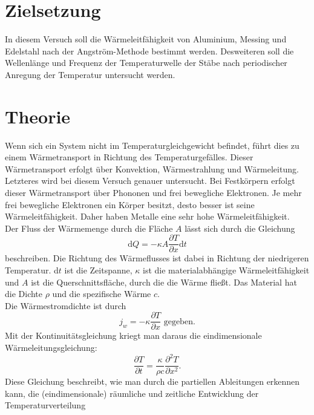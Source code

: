 \section{Zielsetzung}
\label{sec:Zielsetzung}

In diesem Versuch soll die Wärmeleitfähigkeit von Aluminium, Messing und Edelstahl nach der Angström-Methode bestimmt werden. Desweiteren soll die
Wellenlänge und Frequenz der Temperaturwelle der Stäbe nach periodischer Anregung der Temperatur untersucht werden.

\section{Theorie}
\label{sec:Theorie}

Wenn sich ein System nicht im Temperaturgleichgewicht befindet, führt dies zu einem Wärmetransport in Richtung des Temperaturgefälles. Dieser Wärmetransport
erfolgt über Konvektion, Wärmestrahlung und Wärmeleitung. Letzteres wird bei diesem Versuch genauer untersucht. Bei Festkörpern erfolgt dieser Wärmetransport über
Phononen und frei bewegliche Elektronen. Je mehr frei bewegliche Elektronen ein Körper besitzt, desto besser ist seine Wärmeleitfähigkeit. Daher haben Metalle
eine sehr hohe Wärmeleitfähigkeit. \\
Der Fluss der Wärmemenge durch die Fläche $A$ lässt sich durch die Gleichung
\begin{equation}
    \label{eqn:Waermefluss}
    \mathrm{d}Q = - \kappa A \frac{\partial T}{\partial x} \mathrm{d} t
\end{equation}
beschreiben. Die Richtung des Wärmeflusses ist dabei in Richtung der niedrigeren Temperatur. d$t$ ist die Zeitspanne, $\kappa$ ist die materialabhängige
Wärmeleitfähigkeit und $A$ ist die Querschnittsfläche, durch die die Wärme fließt. Das Material hat die Dichte $\rho$ und die spezifische Wärme $c$.\\
Die Wärmestromdichte ist durch
\begin{equation}
    \label{eqn:Waermestromdichte}
    j_w = - \kappa \frac{\partial T}{\partial x} \mathrm{ \, \,  gegeben.}
\end{equation}
Mit der Kontinuitätsgleichung kriegt man daraus die eindimensionale Wärmeleitungsgleichung:
\begin{equation}
    \label{eqn:Warmeleitungsgleichung}
    \frac{\partial T}{\partial t} = \frac{\kappa}{\rho c} \frac{\partial^2 T}{\partial x^2} .
\end{equation}
Diese Gleichung beschreibt, wie man durch die partiellen Ableitungen erkennen kann, die (eindimensionale) räumliche und zeitliche Entwicklung der Temperaturverteilung
